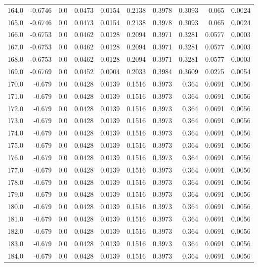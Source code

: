 \begin{longtable}{lrrrrrrrrr}
164.0 & -0.6746 & 0.0 & 0.0473 & 0.0154 & 0.2138 & 0.3978 & 0.3093 & 0.065 & 0.0024 \\
165.0 & -0.6746 & 0.0 & 0.0473 & 0.0154 & 0.2138 & 0.3978 & 0.3093 & 0.065 & 0.0024 \\
166.0 & -0.6753 & 0.0 & 0.0462 & 0.0128 & 0.2094 & 0.3971 & 0.3281 & 0.0577 & 0.0003 \\
167.0 & -0.6753 & 0.0 & 0.0462 & 0.0128 & 0.2094 & 0.3971 & 0.3281 & 0.0577 & 0.0003 \\
168.0 & -0.6753 & 0.0 & 0.0462 & 0.0128 & 0.2094 & 0.3971 & 0.3281 & 0.0577 & 0.0003 \\
169.0 & -0.6769 & 0.0 & 0.0452 & 0.0004 & 0.2033 & 0.3984 & 0.3609 & 0.0275 & 0.0054 \\
170.0 & -0.679 & 0.0 & 0.0428 & 0.0139 & 0.1516 & 0.3973 & 0.364 & 0.0691 & 0.0056 \\
171.0 & -0.679 & 0.0 & 0.0428 & 0.0139 & 0.1516 & 0.3973 & 0.364 & 0.0691 & 0.0056 \\
172.0 & -0.679 & 0.0 & 0.0428 & 0.0139 & 0.1516 & 0.3973 & 0.364 & 0.0691 & 0.0056 \\
173.0 & -0.679 & 0.0 & 0.0428 & 0.0139 & 0.1516 & 0.3973 & 0.364 & 0.0691 & 0.0056 \\
174.0 & -0.679 & 0.0 & 0.0428 & 0.0139 & 0.1516 & 0.3973 & 0.364 & 0.0691 & 0.0056 \\
175.0 & -0.679 & 0.0 & 0.0428 & 0.0139 & 0.1516 & 0.3973 & 0.364 & 0.0691 & 0.0056 \\
176.0 & -0.679 & 0.0 & 0.0428 & 0.0139 & 0.1516 & 0.3973 & 0.364 & 0.0691 & 0.0056 \\
177.0 & -0.679 & 0.0 & 0.0428 & 0.0139 & 0.1516 & 0.3973 & 0.364 & 0.0691 & 0.0056 \\
178.0 & -0.679 & 0.0 & 0.0428 & 0.0139 & 0.1516 & 0.3973 & 0.364 & 0.0691 & 0.0056 \\
179.0 & -0.679 & 0.0 & 0.0428 & 0.0139 & 0.1516 & 0.3973 & 0.364 & 0.0691 & 0.0056 \\
180.0 & -0.679 & 0.0 & 0.0428 & 0.0139 & 0.1516 & 0.3973 & 0.364 & 0.0691 & 0.0056 \\
181.0 & -0.679 & 0.0 & 0.0428 & 0.0139 & 0.1516 & 0.3973 & 0.364 & 0.0691 & 0.0056 \\
182.0 & -0.679 & 0.0 & 0.0428 & 0.0139 & 0.1516 & 0.3973 & 0.364 & 0.0691 & 0.0056 \\
183.0 & -0.679 & 0.0 & 0.0428 & 0.0139 & 0.1516 & 0.3973 & 0.364 & 0.0691 & 0.0056 \\
184.0 & -0.679 & 0.0 & 0.0428 & 0.0139 & 0.1516 & 0.3973 & 0.364 & 0.0691 & 0.0056 \\

\end{longtable}
